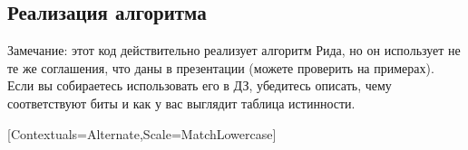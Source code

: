 \begin{nonspeaker}
\thispagestyle{empty}
\subsection{Реализация алгоритма}
Замечание: этот код действительно реализует алгоритм Рида, но он использует не те же соглашения, что даны в презентации (можете проверить на примерах).
Если вы собираетесь использовать его в ДЗ, убедитесь описать, чему соответствуют биты и как у вас выглядит таблица истинности.
\begin{multicols*}{2}
    \setlength{\columnseprule}{0.2pt}
    \setmonofont{Fira Code}[Contextuals=Alternate,Scale=MatchLowercase]
    \fontsize{9pt}{10pt}

    \makeatletter
        \let\FV@ListProcessLine@NoBreak@Orig\FV@ListProcessLine@NoBreak
        \let\FV@ListProcessLine@Break@Orig\FV@ListProcessLine@Break
        \def\FV@ListProcessLine@NoBreak#1{%
          \ifx\FV@Line\empty
            \hbox{}\vspace{\dimexpr-\baselineskip+5pt}%
          \else
            \FV@ListProcessLine@NoBreak@Orig{#1}%
          \fi}
        \def\FV@ListProcessLine@Break#1{%
          \ifx\FV@Line\empty
            \hbox{}\vspace{\dimexpr-\baselineskip+5pt}%
          \else
            \FV@ListProcessLine@Break@Orig{#1}%
          \fi}
    \makeatother
    \inputminted[mathescape,breaklines,python3,tabsize=2]{python}{ReedMuller.py}
\end{multicols*}
\restoregeometry
\end{nonspeaker}
